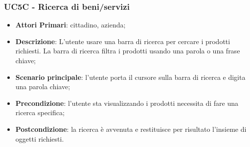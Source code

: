  \subsubsection{UC5C - Ricerca di beni/servizi}
\begin{itemize}
	\item \textbf{Attori Primari}: cittadino, azienda;
	\item \textbf{Descrizione}: L'utente usare una barra di ricerca per cercare i prodotti richiesti. La barra di ricerca filtra i prodotti usando una parola o una frase chiave;
	\item \textbf{Scenario principale}: l'utente porta il cursore sulla barra di ricerca e digita una parola chiave;
	\item \textbf{Precondizione}: l'utente sta visualizzando i prodotti necessita di fare una ricerca specifica;
	\item \textbf{Postcondizione}: la ricerca è avvenuta e restituisce per risultato l'insieme di oggetti richiesti.
\end{itemize}